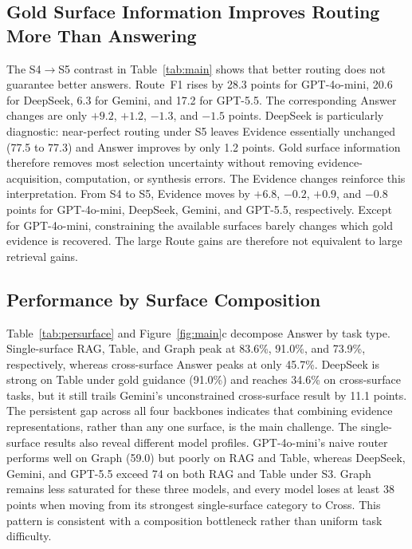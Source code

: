 \documentclass[11pt]{article}
\begin{document}
\subsection{Gold Surface Information Improves Routing More Than Answering}
\label{sec:routing-answer}
The S4$\to$S5 contrast in Table~\ref{tab:main} shows that better routing does
not guarantee better answers. Route~F1 rises by 28.3 points for GPT-4o-mini,
20.6 for DeepSeek, 6.3 for Gemini, and 17.2 for GPT-5.5. The corresponding
Answer changes are only $+9.2$, $+1.2$, $-1.3$, and $-1.5$ points. DeepSeek is
particularly diagnostic: near-perfect routing under S5 leaves Evidence
essentially unchanged (77.5 to 77.3) and Answer improves by only 1.2 points.
Gold surface information therefore removes most selection uncertainty without
removing evidence-acquisition, computation, or synthesis errors.
The Evidence changes reinforce this interpretation. From S4 to S5, Evidence
moves by $+6.8$, $-0.2$, $+0.9$, and $-0.8$ points for GPT-4o-mini, DeepSeek,
Gemini, and GPT-5.5, respectively. Except for GPT-4o-mini, constraining the
available surfaces barely changes which gold evidence is recovered. The large
Route gains are therefore not equivalent to large retrieval gains.

\subsection{Performance by Surface Composition}
\label{sec:persurface}
Table~\ref{tab:persurface} and Figure~\ref{fig:main}c decompose Answer by task
type. Single-surface RAG, Table, and Graph peak at 83.6\%, 91.0\%, and 73.9\%,
respectively, whereas cross-surface Answer peaks at only 45.7\%. DeepSeek is
strong on Table under gold guidance (91.0\%) and reaches 34.6\% on cross-surface
tasks, but it still trails Gemini's unconstrained cross-surface result by 11.1
points. The persistent gap across all four backbones indicates that combining
evidence representations, rather than any one surface, is the main challenge.
The single-surface results also reveal different model profiles. GPT-4o-mini's
naive router performs well on Graph (59.0) but poorly on RAG and Table, whereas
DeepSeek, Gemini, and GPT-5.5 exceed 74 on both RAG and Table under S3. Graph
remains less saturated for these three models, and every model loses at least
38 points when moving from its strongest single-surface category to Cross.
This pattern is consistent with a composition bottleneck rather than uniform
task difficulty.
\end{document}
